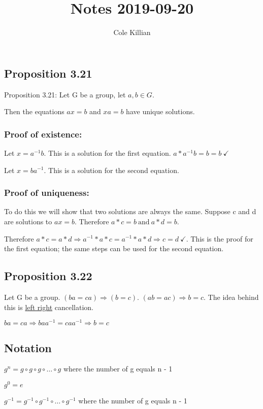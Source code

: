 \documentclass[class=scrartcl, crop=false]{standalone}
\begin{document}
\title{Notes 2019-09-20}
\author{Cole Killian}


\subsection{Proposition 3.21}

Proposition 3.21: Let G be a group, let $a, b \in G$.

Then the equations $ax = b$ and $xa = b$ have unique solutions.

\subsubsection{Proof of existence:} Let $x = a^{-1}b$. This is a solution for the first equation. $a * a^{-1}b = b = b \ \checkmark$ 

Let $x = ba^{-1}$. This is a solution for the second equation.

\subsubsection{Proof of uniqueness:} To do this we will show that two solutions are always the same. Suppose c and d are solutions to $ax = b$. Therefore $a * c = b \ \text{and} \ a * d = b$.

Therefore $a * c = a * d \Rightarrow a^{-1} * a * c = a^{-1} * a * d \Rightarrow c = d \ \checkmark$. This is the proof for the first equation; the same steps can be used for the second equation.

\subsection{Proposition 3.22}

Let G be a group. $(ba = ca) \Rightarrow (b = c)$.  $(ab = ac) \Rightarrow b = c$. The idea behind this is \underline{left right} cancellation.

$ba = ca \Rightarrow baa^{-1} = caa^{-1} \Rightarrow b = c$

\subsection{Notation}

$g^n = g \circ g \circ g \circ \dots \circ g$ where the number of g equals n - 1

$g^0 = e$

$g^{-1} = g^{-1} \circ g^{-1} \circ \dots \circ g^{-1}$ where the number of g equals n - 1
\end{document}
